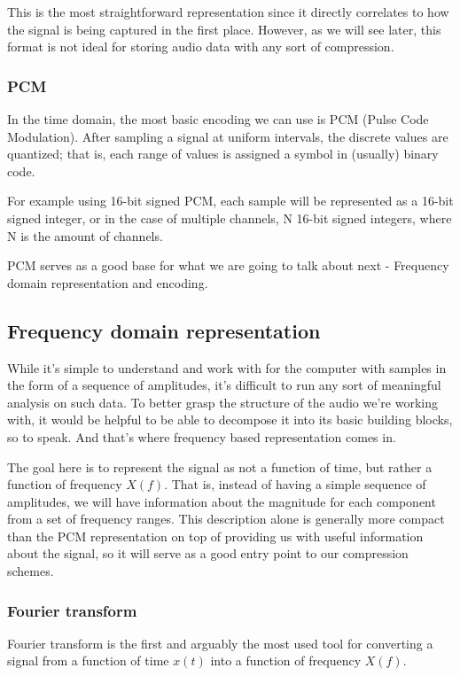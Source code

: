 This is the most straightforward representation since it directly correlates to how the signal is being captured in the first place. However, as we will see later, this format is not ideal for storing audio data with any sort of compression.

\subsubsection{PCM}
In the time domain, the most basic encoding we can use is PCM (Pulse Code Modulation). After sampling a signal at uniform intervals, the discrete values are quantized; that is, each range of values is assigned a symbol in (usually) binary code.

For example using 16-bit signed PCM, each sample will be represented as a 16-bit signed integer, or in the case of multiple channels, N 16-bit signed integers, where N is the amount of channels.

PCM serves as a good base for what we are going to talk about next - Frequency domain representation and encoding.

\subsection{Frequency domain representation}
While it's simple to understand and work with for the computer with samples in the form of a sequence of amplitudes, it's difficult to run any sort of meaningful analysis on such data. To better grasp the structure of the audio we're working with, it would be helpful to be able to decompose it into its basic building blocks, so to speak. And that's where frequency based representation comes in.

The goal here is to represent the signal as not a function of time, but rather a function of frequency $X(f)$. That is, instead of having a simple sequence of amplitudes, we will have information about the magnitude for each component from a set of frequency ranges. This description alone is generally more compact than the PCM representation \cite{bosi_goldberg_2003} on top of providing us with useful information about the signal, so it will serve as a good entry point to our compression schemes.

\subsubsection{Fourier transform}
Fourier transform is the first and arguably the most used tool for converting a signal from a function of time $x(t)$ into a function of frequency $X(f)$.

